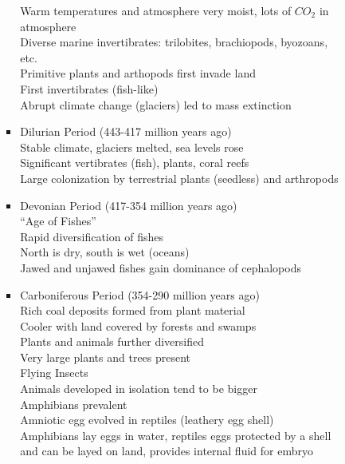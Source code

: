 \documentclass[12pt]{article}
\begin{document}
\begin{itemize}
\begin{itemize}
\begin{itemize}
\begin{itemize}
                    Warm temperatures and atmosphere very moist, lots of $CO_2$ in atmosphere \\
                    Diverse marine invertibrates: trilobites, brachiopods, byozoans, etc. \\
                    Primitive plants and arthopods first invade land \\
                    First invertibrates (fish-like) \\
                    Abrupt climate change (glaciers) led to mass extinction
                    \item Dilurian Period (443-417 million years ago) \\
                    Stable climate, glaciers melted, sea levels rose \\
                    Significant vertibrates (fish), plants, coral reefs \\
                    Large colonization by terrestrial plants (seedless) and arthropods
                    \item Devonian Period (417-354 million years ago) \\
                    ``Age of Fishes'' \\
                    Rapid diversification of fishes \\
                    North is dry, south is wet (oceans) \\
                    Jawed and unjawed fishes gain dominance of cephalopods
                    \item Carboniferous Period (354-290 million years ago) \\
                    Rich coal deposits formed from plant material \\
                    Cooler with land covered by forests and swamps \\
                    Plants and animals further diversified \\
                    Very large plants and trees present \\
                    Flying Insects \\
                    Animals developed in isolation tend to be bigger\\
                    Amphibians prevalent \\
                    Amniotic egg evolved in reptiles (leathery egg shell)\\
                    Amphibians lay eggs in water, reptiles eggs protected by a shell and can be layed on land, provides internal fluid for embryo

\end{itemize}
\end{itemize}
\end{itemize}
\end{itemize}
\end{document}
